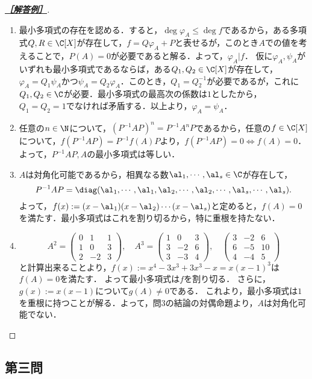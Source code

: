 \documentclass[uplatex,dvipdfmx]{jsarticle}
\begin{document}
\begin{proof}[\textbf{\underline{［解答例］}}]\mbox{}
    \begin{enumerate}
        \item 最小多項式の存在を認める．すると，$\deg\varphi_A\le\deg f$であるから，ある多項式$Q,R\in\C[X]$が存在して，$f=Q\varphi_A+P$と表せるが，このとき$A$での値を考えることで，$P(A)=0$が必要であると解る．よって，$\varphi_A|f$．
        仮に$\varphi_A,\psi_A$がいずれも最小多項式であるならば，ある$Q_1,Q_2\in\C[X]$が存在して，$\varphi_A=Q_1\psi_A$かつ$\psi_A=Q_2\varphi_A$．このとき，$Q_1=Q_2^{-1}$が必要であるが，これに$Q_1,Q_2\in\C$が必要．最小多項式の最高次の係数は$1$としたから，$Q_1=Q_2=1$でなければ矛盾する．以上より，$\varphi_A=\psi_A$．
        \item 任意の$n\in\N$について，$(P^{-1}AP)^n=P^{-1}A^nP$であるから，任意の$f\in\C[X]$について，$f(P^{-1}AP)=P^{-1}f(A)P$より，$f(P^{-1}AP)=0\Leftrightarrow f(A)=0$．よって，$P^{-1}AP,A$の最小多項式は等しい．
        \item $A$は対角化可能であるから，相異なる数$\al_1,\cdots,\al_s\in\C$が存在して，
        \[P^{-1}AP=\diag(\al_1,\cdots,\al_1,\al_2,\cdots,\al_2,\cdots,\al_s,\cdots,\al_s).\]
        よって，$f(x):=(x-\al_1)(x-\al_2)\cdots(x-\al_s)$と定めると，$f(A)=0$を満たす．最小多項式はこれを割り切るから，特に重根を持たない．
        \item \[A^2=\begin{pmatrix}
            0&1&1\\1&0&3\\2&-2&3
        \end{pmatrix},\quad A^3=\begin{pmatrix}
            1&0&3\\3&-2&6\\3&-3&4
        \end{pmatrix},\quad\begin{pmatrix}
            3&-2&6\\6&-5&10\\4&-4&5
        \end{pmatrix}\]
        と計算出来ることより，$f(x):=x^4-3x^3+3x^3-x=x(x-1)^3$は$f(A)=0$を満たす．
        よって最小多項式は$f$を割り切る．
        さらに，$g(x):=x(x-1)$について$g(A)\ne0$である．
        これより，最小多項式は$1$を重根に持つことが解る．よって，問3の結論の対偶命題より，$A$は対角化可能でない．
    \end{enumerate}
\end{proof}

\subsection{第三問}
\end{document}
